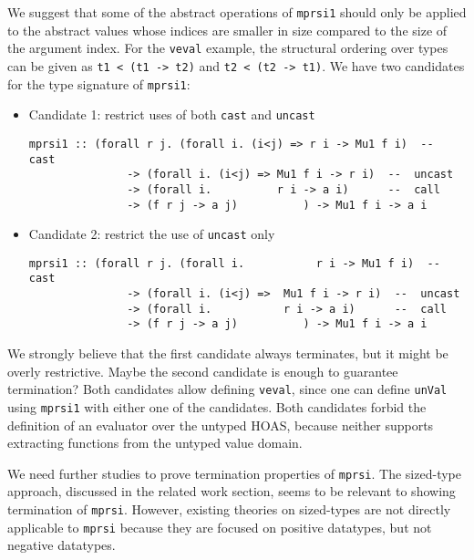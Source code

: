 We suggest that some of the abstract operations of \lstinline{mprsi1} should
only be applied to the abstract values whose indices are smaller in size
compared to the size of the argument index. For the \lstinline{veval} example,
the structural ordering over types can be given as
\lstinline{t1 < (t1 -> t2)} and \lstinline{t2 < (t2 -> t1)}.
We have two candidates for the type signature of \lstinline{mprsi1}:
\begin{itemize}
\item Candidate 1: restrict uses of both \lstinline{cast} and \lstinline{uncast}
\begin{lstlisting}
mprsi1 :: (forall r j. (forall i. (i<j) => r i -> Mu1 f i)  --  cast
               -> (forall i. (i<j) => Mu1 f i -> r i)  --  uncast
               -> (forall i.          r i -> a i)      --  call
               -> (f r j -> a j)          ) -> Mu1 f i -> a i
\end{lstlisting}
\item Candidate 2: restrict the use of \lstinline{uncast} only
\begin{lstlisting}
mprsi1 :: (forall r j. (forall i.           r i -> Mu1 f i)  --  cast
               -> (forall i. (i<j) =>  Mu1 f i -> r i)  --  uncast
               -> (forall i.           r i -> a i)      --  call
               -> (f r j -> a j)          ) -> Mu1 f i -> a i
\end{lstlisting}
\end{itemize}
We strongly believe that the first candidate always terminates,
but it might be overly restrictive. Maybe the second candidate is
enough to guarantee termination? Both candidates allow defining
\lstinline{veval}, since one can define \lstinline{unVal}
using \lstinline{mprsi1} with either one of the candidates.
Both candidates forbid the definition of an evaluator over the untyped HOAS,
because neither supports extracting functions from the untyped value domain.

We need further studies to prove termination properties of \lstinline{mprsi}.
The sized-type approach, discussed in the related work section,
seems to be relevant to showing termination of \lstinline{mprsi}.
However, existing theories on sized-types are not directly applicable to
\lstinline{mprsi} because they are focused on positive datatypes, but
not negative datatypes.
\newpage



